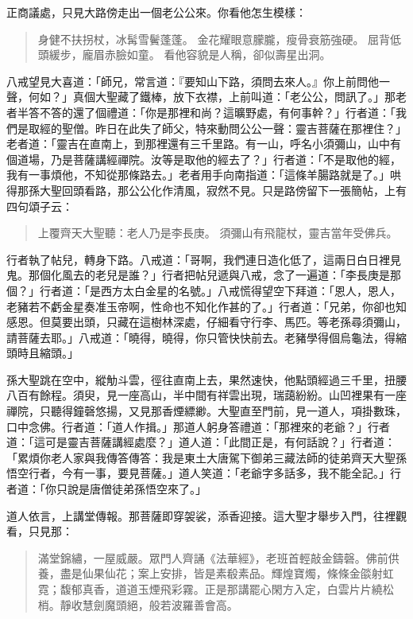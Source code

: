 正商議處，只見大路傍走出一個老公公來。你看他怎生模樣：
\begin{quote}
身健不扶拐杖，冰髯雪鬢蓬蓬。
金花耀眼意朦朧，瘦骨衰筋強硬。
屈背低頭緩步，龐眉赤臉如童。
看他容貌是人稱，卻似壽星出洞。
\end{quote}

八戒望見大喜道：「師兄，常言道：『要知山下路，須問去來人。』你上前問他一聲，何如？」真個大聖藏了鐵棒，放下衣襟，上前叫道：「老公公，問訊了。」那老者半答不答的還了個禮道：「你是那裡和尚？這曠野處，有何事幹？」行者道：「我們是取經的聖僧。昨日在此失了師父，特來動問公公一聲：靈吉菩薩在那裡住？」老者道：「靈吉在直南上，到那裡還有三千里路。有一山，呼名小須彌山，山中有個道場，乃是菩薩講經禪院。汝等是取他的經去了？」行者道：「不是取他的經，我有一事煩他，不知從那條路去。」老者用手向南指道：「這條羊腸路就是了。」哄得那孫大聖回頭看路，那公公化作清風，寂然不見。只是路傍留下一張簡帖，上有四句頌子云：
\begin{quote}
上覆齊天大聖聽：老人乃是李長庚。
須彌山有飛龍杖，靈吉當年受佛兵。
\end{quote}

行者執了帖兒，轉身下路。八戒道：「哥啊，我們連日造化低了，這兩日白日裡見鬼。那個化風去的老兒是誰？」行者把帖兒遞與八戒，念了一遍道：「李長庚是那個？」行者道：「是西方太白金星的名號。」八戒慌得望空下拜道：「恩人，恩人，老豬若不虧金星奏准玉帝啊，性命也不知化作甚的了。」行者道：「兄弟，你卻也知感恩。但莫要出頭，只藏在這樹林深處，仔細看守行李、馬匹。等老孫尋須彌山，請菩薩去耶。」八戒道：「曉得，曉得，你只管快快前去。老豬學得個烏龜法，得縮頭時且縮頭。」

孫大聖跳在空中，縱觔斗雲，徑往直南上去，果然速快，他點頭經過三千里，扭腰八百有餘程。須臾，見一座高山，半中間有祥雲出現，瑞藹紛紛。山凹裡果有一座禪院，只聽得鐘磬悠揚，又見那香煙縹緲。大聖直至門前，見一道人，項掛數珠，口中念佛。行者道：「道人作揖。」那道人躬身答禮道：「那裡來的老爺？」行者道：「這可是靈吉菩薩講經處麼？」道人道：「此間正是，有何話說？」行者道：「累煩你老人家與我傳答傳答：我是東土大唐駕下御弟三藏法師的徒弟齊天大聖孫悟空行者，今有一事，要見菩薩。」道人笑道：「老爺字多話多，我不能全記。」行者道：「你只說是唐僧徒弟孫悟空來了。」

道人依言，上講堂傳報。那菩薩即穿袈裟，添香迎接。這大聖才舉步入門，往裡觀看，只見那：
\begin{quote}
滿堂錦繡，一屋威嚴。眾門人齊誦《法華經》，老班首輕敲金鑄磬。佛前供養，盡是仙果仙花；案上安排，皆是素殽素品。輝煌寶燭，條條金燄射虹霓；馥郁真香，道道玉煙飛彩霧。正是那講罷心閑方入定，白雲片片繞松梢。靜收慧劍魔頭絕，般若波羅善會高。
\end{quote}

